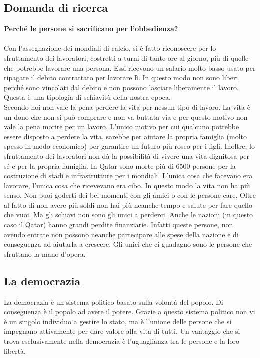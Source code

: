 \documentclass[a4paper, 12pt]{article}
\begin{document}
\pagebreak

\subsection{Domanda di ricerca}

\textbf{Perché le persone si sacrificano per l'obbedienza?} \\\\
Con l'assegnazione dei mondiali di calcio, si è fatto riconoscere per lo sfruttamento dei lavoratori, costretti a turni di tante ore al giorno, più di quelle che potrebbe lavorare una persona. Essi ricevono un salario molto basso usato per ripagare il debito contrattato per lavorare lì. In questo modo non sono liberi, perché sono vincolati dal debito e non possono lasciare liberamente il lavoro. Questa è una tipologia di schiavitù della nostra epoca. \\ Secondo noi non vale la pena perdere la vita per nessun tipo di lavoro. La vita è un dono che non si può comprare e non va buttata via e per questo motivo non vale la pena morire per un lavoro. L'unico motivo per cui qualcuno potrebbe essere disposto a perdere la vita, sarebbe per aiutare la propria famiglia (molto spesso in modo economico) per garantire un futuro più roseo per i figli. Inoltre, lo sfruttamento dei lavoratori non dà la possibilità di vivere una vita dignitosa per sé e per la propria famiglia. In Qatar sono morte più di 6500 persone per la costruzione di stadi e infrastrutture per i mondiali. L'unica cosa che facevano era lavorare, l'unica cosa che ricevevano era cibo. In questo modo la vita non ha più senso. Non puoi goderti dei bei momenti con gli amici o con le persone care. Oltre al fatto di non avere più soldi non hai più neanche tempo e salute per fare quello che vuoi. Ma gli schiavi non sono gli unici a perderci. Anche le nazioni (in questo caso il Qatar) hanno grandi perdite finanziarie. Infatti queste persone, non avendo entrate non possono neanche partecipare alle spese della nazione e di conseguenza ad aiutarla a crescere. Gli unici che ci guadagno sono le persone che sfruttano la mano d'opera.

\pagebreak

\subsection{La democrazia}

La democrazia è un sistema politico basato sulla volontà del popolo. Di conseguenza è il popolo ad avere il potere. Grazie a questo sistema politico non vi è un singolo individuo a gestire lo stato, ma è l'unione delle persone che si impegnano attivamente per dare valore alla vita di tutti. Un vantaggio che si trova esclusivamente nella democrazia è l'uguaglianza tra le persone e la loro libertà.
\end{document}

